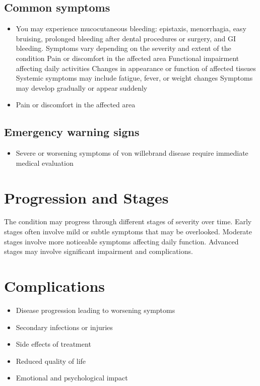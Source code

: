 \subsection{Common symptoms}
\begin{itemize}[noitemsep]
  \item You may experience mucocutaneous bleeding: epistaxis, menorrhagia, easy bruising, prolonged bleeding after dental procedures or surgery, and GI bleeding. Symptoms vary depending on the severity and extent of the condition Pain or discomfort in the affected area Functional impairment affecting daily activities Changes in appearance or function of affected tissues Systemic symptoms may include fatigue, fever, or weight changes Symptoms may develop gradually or appear suddenly
  \item Pain or discomfort in the affected area
  \end{itemize}

\subsection{Emergency warning signs}
\begin{itemize}[noitemsep]
  \item Severe or worsening symptoms of von willebrand disease require immediate medical evaluation
\end{itemize}
\section{Progression and Stages}
The condition may progress through different stages of severity over time. Early stages often involve mild or subtle symptoms that may be overlooked. Moderate stages involve more noticeable symptoms affecting daily function. Advanced stages may involve significant impairment and complications.
\section{Complications}
\begin{itemize}[noitemsep]
  \item Disease progression leading to worsening symptoms
  \item Secondary infections or injuries
  \item Side effects of treatment
  \item Reduced quality of life
  \item Emotional and psychological impact
\end{itemize}
